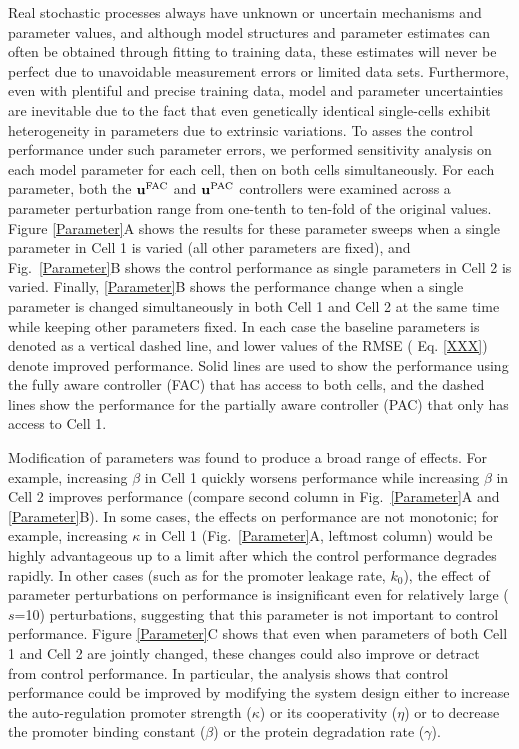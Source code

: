 \documentclass[12pt]{iopart}
\begin{document}
Real stochastic processes always have unknown or uncertain mechanisms and parameter values, and although model structures and parameter estimates can often be obtained through fitting to training data, these estimates will never be perfect due to unavoidable measurement errors or limited data sets. 
Furthermore, even with plentiful and precise training data, model and parameter uncertainties are inevitable due to the fact that even genetically identical single-cells exhibit heterogeneity in parameters due to extrinsic variations.
To asses the control performance under such parameter errors, we performed sensitivity analysis on each model parameter for each cell, then on both cells simultaneously. 
For each parameter, both the $\mathbf{u}^{\rm FAC}$ and $\mathbf{u}^{\rm PAC}$ controllers were examined across a parameter perturbation range from one-tenth to ten-fold of the original values.
Figure \ref{Parameter}A shows the results for these parameter sweeps when a single parameter in Cell 1 is varied (all other parameters are fixed), and Fig.\ \ref{Parameter}B shows the control performance as single parameters in Cell 2 is varied. 
Finally, \ref{Parameter}B shows the performance change when a single parameter is changed simultaneously in both Cell 1 and Cell 2 at the same time while keeping other parameters fixed.
In each case the baseline parameters is denoted as a vertical dashed line, and lower values of the RMSE ( Eq. \ref{XXX}) denote improved performance. 
Solid lines are used to show the performance using the fully aware controller (FAC) that has access to both cells, and the dashed lines show the performance for the partially aware controller (PAC) that only has access to Cell 1.

Modification of parameters was found to produce a broad range of effects. 
For example, increasing $\beta$ in Cell 1 quickly worsens performance while increasing $\beta$ in Cell 2 improves performance (compare second column in Fig.\ \ref{Parameter}A and \ref{Parameter}B). 
In some cases, the effects on performance are not monotonic; for example, increasing $\kappa$ in Cell 1 (Fig.\ \ref{Parameter}A, leftmost column) would be highly advantageous up to a limit after which the control performance degrades rapidly. 
In other cases (such as for the promoter leakage rate, $k_0$), the effect of parameter perturbations on performance is insignificant even for relatively large ($s$=10) perturbations, suggesting that this parameter is not important to control performance.
Figure \ref{Parameter}C shows that even when parameters of both Cell 1 and Cell 2 are jointly changed, these changes could also improve or detract from control performance. 
In particular, the analysis shows that control performance could be improved by modifying the system design either to increase the auto-regulation promoter strength ($\kappa$) or its cooperativity ($\eta$) or to decrease the promoter binding constant ($\beta$) or the protein degradation rate ($\gamma$). 
\end{document}

